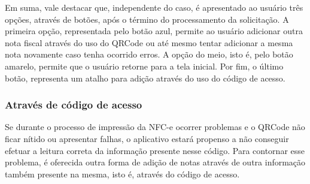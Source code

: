 \newpage
Em suma, vale destacar que, independente do caso, é apresentado ao usuário três opções, através de botões, após o término do processamento da solicitação. A primeira opção, representada pelo botão azul, permite ao usuário adicionar outra nota fiscal através do uso do QRCode ou até mesmo tentar adicionar a mesma nota novamente caso tenha ocorrido erros. A opção do meio, isto é, pelo botão amarelo, permite que o usuário retorne para a tela inicial. Por fim, o último botão, representa um atalho para adição através do uso do código de acesso.

\subsubsection{Através de código de acesso}

Se durante o processo de impressão da NFC-e ocorrer problemas e o QRCode não ficar nítido ou apresentar falhas, o aplicativo estará propenso a não conseguir efetuar a leitura correta da informação presente nesse código. Para contornar esse problema, é oferecida outra forma de adição de notas através de outra informação também presente na mesma, isto é, através do código de acesso.

